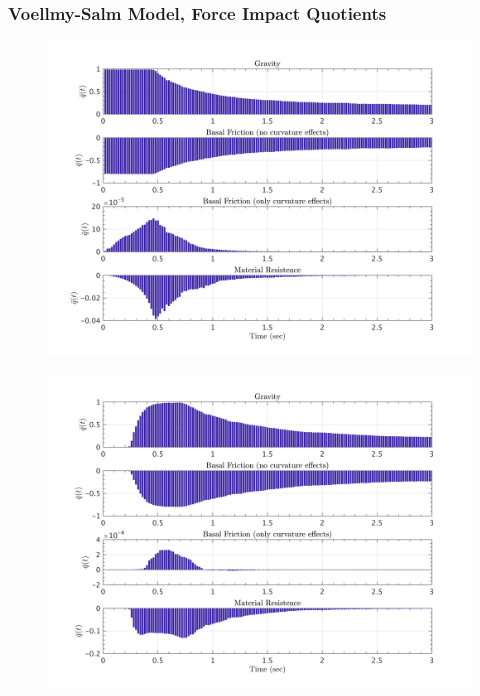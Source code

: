 \documentclass{article}
\begin{document}
\subsubsection{Voellmy-Salm Model, Force Impact Quotients}
\begin{figure}[H]
        \begin{minipage}[b]{0.5\linewidth}
                \centering
                \includegraphics[width=1\textwidth]{InclinedPlane/LocalRecords/ContribF1_V_x.png}
                \label{fig:Ramp-Vx1}
        \end{minipage}
        \begin{minipage}[b]{0.5\linewidth}
                \centering
                \includegraphics[width=1\textwidth]{InclinedPlane/LocalRecords/ContribF8_V_x.png}
                \label{fig:Ramp-Vx2}
        \end{minipage}


\end{figure}
\end{document}
